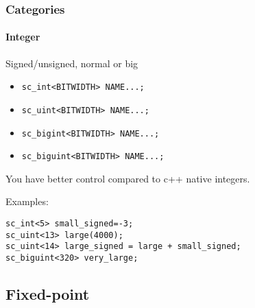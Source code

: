 \begin{frame}[fragile]
\frametitle{Categories}
\framesubtitle{Integer}

\begin{block}{Signed/unsigned, normal or big}
\begin{itemize}
\item \texttt{sc\_int<BITWIDTH> NAME...;}
\item \texttt{sc\_uint<BITWIDTH> NAME...;}
\item \texttt{sc\_bigint<BITWIDTH> NAME...;}
\item \texttt{sc\_biguint<BITWIDTH> NAME...;}
\end{itemize}
You have better control compared to c++ native integers.
\end{block}
\pause
\begin{block}{Examples:} 
\vspace{-1em}
\begin{verbatim}
sc_int<5> small_signed=-3;
sc_uint<13> large(4000);
sc_uint<14> large_signed = large + small_signed;
sc_biguint<320> very_large;
\end{verbatim}
\vspace{-1em}
\end{block}

\end{frame}

\subsection{Fixed-point}

